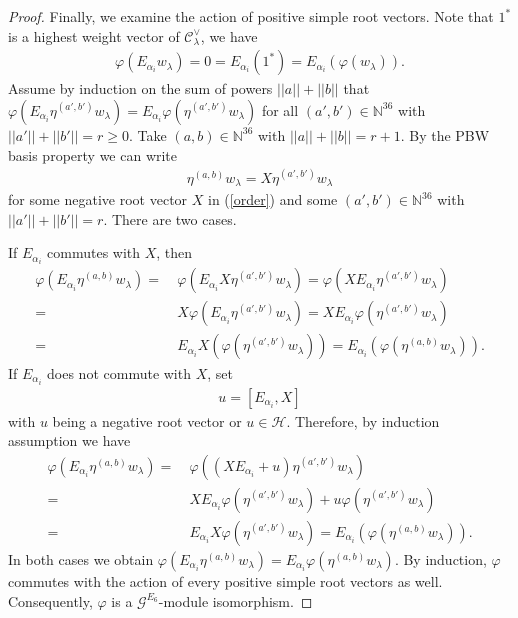 \documentclass[12pt]{article}
\numberwithin{equation}{section}
\theoremstyle{definition}
\theoremstyle{remark}
\begin{document}
\begin{proof}
	Finally, we examine the action of positive simple root vectors. Note that $1^*$ is a highest weight vector of $\mathscr{C}_{\lambda}^{\vee}$, we have
	\begin{align}
		\varphi(E_{\alpha_i}w_{\lambda})=0=E_{\alpha_i}(1^*)=E_{\alpha_i}(\varphi(w_{\lambda})).
	\end{align}
	Assume by induction on the sum of powers $||a||+||b||$ that $\varphi(E_{\alpha_i}\eta^{(a',b')}w_\lambda)=E_{\alpha_i}\varphi(\eta^{(a',b')}w_\lambda)$ for all $(a',b')\in\mathbb{N}^{36}$ with $||a'||+||b'||=r\geqslant0$. Take $(a,b)\in\mathbb{N}^{36}$ with $||a||+||b||=r+1$. By the PBW basis property we can write
	\begin{eqnarray}
		\eta^{(a,b)}w_{\lambda}=X\eta^{(a',b')}w_{\lambda}
	\end{eqnarray}
	for some negative root vector $X$ in (\ref{order}) and some $(a',b')\in\mathbb{N}^{36}$ with $||a'||+||b'||=r$. There are two cases. 
	
	If $E_{\alpha_i}$ commutes with $X$, then
	\begin{align}
		\varphi(E_{\alpha_i}\eta^{(a,b)}w_{\lambda})=&\:\varphi(E_{\alpha_i}X\eta^{(a',b')}w_{\lambda})=\varphi(XE_{\alpha_i}\eta^{(a',b')}w_{\lambda})\nonumber\\
		=&\:X\varphi(E_{\alpha_i}\eta^{(a',b')}w_{\lambda})=XE_{\alpha_i}\varphi(\eta^{(a',b')}w_{\lambda})\nonumber\\
		=&\:E_{\alpha_i}X(\varphi(\eta^{(a',b')}w_{\lambda}))=E_{\alpha_i}(\varphi(\eta^{(a,b)}w_{\lambda})).
	\end{align}
	If $E_{\alpha_i}$ does not commute with $X$, set
	\begin{align}
		u=[E_{\alpha_i},X]
	\end{align}
	with $u$ being a negative root vector or $u\in \mathscr{H}$. Therefore, by induction assumption we have
	\begin{align}
		\varphi(E_{\alpha_i}\eta^{(a,b)}w_{\lambda})=&\:\varphi((XE_{\alpha_i}+u)\eta^{(a',b')}w_{\lambda})\nonumber\\
		=&\:XE_{\alpha_i}\varphi(\eta^{(a',b')}w_{\lambda})+u\varphi(\eta^{(a',b')}w_{\lambda})\nonumber\\
		=&\:E_{\alpha_i}X\varphi(\eta^{(a',b')}w_{\lambda})=E_{\alpha_i}(\varphi(\eta^{(a,b)}w_{\lambda})).
	\end{align}
	In both cases we obtain $\varphi(E_{\alpha_i}\eta^{(a,b)}w_\lambda)=E_{\alpha_i}\varphi(\eta^{(a,b)}w_\lambda)$. By induction, $\varphi$ commutes with the action of every positive simple root vectors as well.
	Consequently, $\varphi$ is a $\mathscr{G}^{E_6}$-module isomorphism.	
\end{proof}
\end{document}
